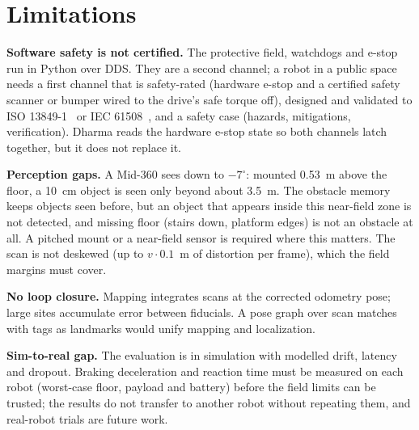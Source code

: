 \section{Limitations}
\label{sec:limits}

\textbf{Software safety is not certified.} The protective field, watchdogs and e-stop run in
Python over DDS. They are a second channel; a robot in a public space needs a first channel
that is safety-rated (hardware e-stop and a certified safety scanner or bumper wired to the
drive's safe torque off), designed and validated to ISO 13849-1~\cite{iso13849} or IEC
61508~\cite{iec61508}, and a safety case (hazards, mitigations, verification). Dharma reads the
hardware e-stop state so both channels latch together, but it does not replace it.

\textbf{Perception gaps.} A Mid-360 sees down to $-7^\circ$: mounted 0.53~m above the floor, a
10~cm object is seen only beyond about 3.5~m. The obstacle memory keeps objects seen before, but
an object that appears inside this near-field zone is not detected, and missing floor (stairs
down, platform edges) is not an obstacle at all. A pitched mount or a near-field sensor is
required where this matters. The scan is not deskewed (up to $v \cdot 0.1$~m of distortion per
frame), which the field margins must cover.

\textbf{No loop closure.} Mapping integrates scans at the corrected odometry pose; large sites
accumulate error between fiducials. A pose graph over scan matches with tags as landmarks would
unify mapping and localization.

\textbf{Sim-to-real gap.} The evaluation is in simulation with modelled drift, latency and
dropout. Braking deceleration and reaction time must be measured on each robot (worst-case
floor, payload and battery) before the field limits can be trusted; the results do not
transfer to another robot without repeating them, and real-robot trials are future work.
